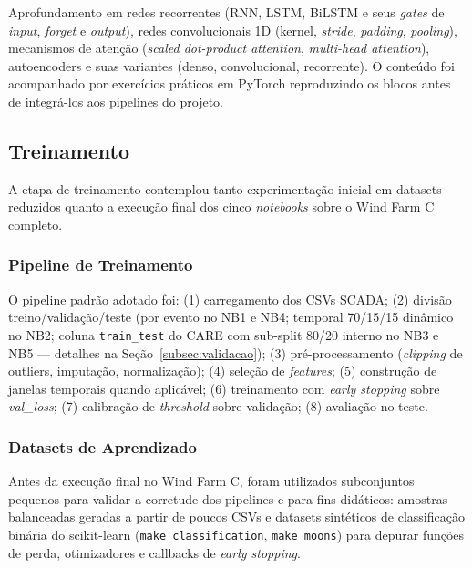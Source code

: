 \documentclass[12pt]{article}
\begin{document}
Aprofundamento em redes recorrentes (RNN, LSTM, BiLSTM e seus \textit{gates} de \textit{input}, \textit{forget} e \textit{output}), redes convolucionais 1D (kernel, \textit{stride}, \textit{padding}, \textit{pooling}), mecanismos de atenção (\textit{scaled dot-product attention}, \textit{multi-head attention}), autoencoders e suas variantes (denso, convolucional, recorrente). O conteúdo foi acompanhado por exercícios práticos em PyTorch reproduzindo os blocos antes de integrá-los aos pipelines do projeto.

\subsection{Treinamento}

A etapa de treinamento contemplou tanto experimentação inicial em datasets reduzidos quanto a execução final dos cinco \textit{notebooks} sobre o Wind Farm C completo.

\subsubsection{Pipeline de Treinamento}

\begin{sloppypar}
O pipeline padrão adotado foi: (1) carregamento dos CSVs SCADA; (2) divisão treino/validação/teste (por evento no NB1 e NB4; temporal 70/15/15 dinâmico no NB2; coluna \texttt{train\_test} do CARE com sub-split 80/20 interno no NB3 e NB5 --- detalhes na Seção~\ref{subsec:validacao}); (3) pré-processamento (\textit{clipping} de outliers, imputação, normalização); (4) seleção de \textit{features}; (5) construção de janelas temporais quando aplicável; (6) treinamento com \textit{early stopping} sobre \textit{val\_loss}; (7) calibração de \textit{threshold} sobre validação; (8) avaliação no teste.
\end{sloppypar}

\subsubsection{Datasets de Aprendizado}

Antes da execução final no Wind Farm C, foram utilizados subconjuntos pequenos para validar a corretude dos pipelines e para fins didáticos: amostras balanceadas geradas a partir de poucos CSVs e datasets sintéticos de classificação binária do scikit-learn (\texttt{make\_classification}, \texttt{make\_moons}) para depurar funções de perda, otimizadores e callbacks de \textit{early stopping}.
\end{document}
